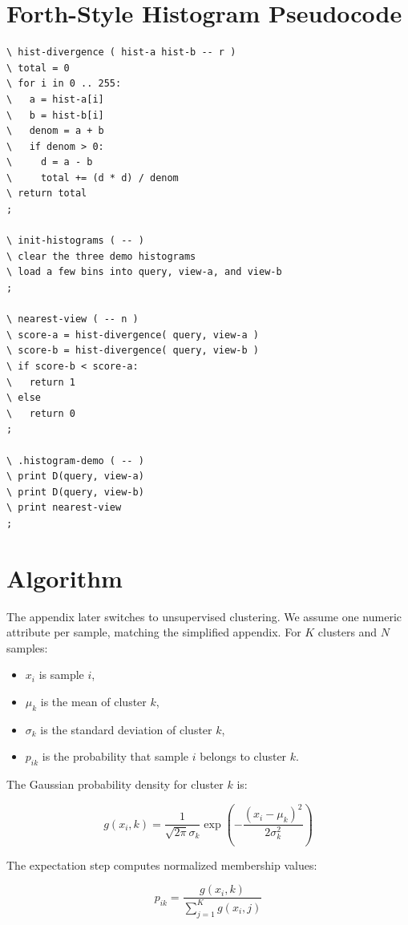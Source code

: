\documentclass[11pt]{article}
\begin{document}
\section*{Forth-Style Histogram Pseudocode}

\begin{lstlisting}
\ hist-divergence ( hist-a hist-b -- r )
\ total = 0
\ for i in 0 .. 255:
\   a = hist-a[i]
\   b = hist-b[i]
\   denom = a + b
\   if denom > 0:
\     d = a - b
\     total += (d * d) / denom
\ return total
;

\ init-histograms ( -- )
\ clear the three demo histograms
\ load a few bins into query, view-a, and view-b
;

\ nearest-view ( -- n )
\ score-a = hist-divergence( query, view-a )
\ score-b = hist-divergence( query, view-b )
\ if score-b < score-a:
\   return 1
\ else
\   return 0
;

\ .histogram-demo ( -- )
\ print D(query, view-a)
\ print D(query, view-b)
\ print nearest-view
;
\end{lstlisting}

\section*{Algorithm}

The appendix later switches to unsupervised clustering. We assume one numeric attribute per sample, matching the simplified appendix. For $K$ clusters and $N$ samples:

\begin{itemize}
\item $x_i$ is sample $i$,
\item $\mu_k$ is the mean of cluster $k$,
\item $\sigma_k$ is the standard deviation of cluster $k$,
\item $p_{ik}$ is the probability that sample $i$ belongs to cluster $k$.
\end{itemize}

The Gaussian probability density for cluster $k$ is:

\begin{equation}
g(x_i, k) =
\frac{1}{\sqrt{2\pi}\sigma_k}
\exp\left(-\frac{(x_i-\mu_k)^2}{2\sigma_k^2}\right)
\end{equation}

The expectation step computes normalized membership values:

\begin{equation}
p_{ik} = \frac{g(x_i,k)}{\sum_{j=1}^{K} g(x_i,j)}
\end{equation}
\end{document}
